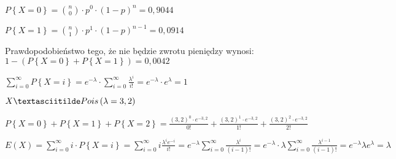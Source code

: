 \documentclass[fleqn]{article}
\begin{document}
$P\left\lbrace X=0\right\rbrace={n\choose 0}\cdot p^0\cdot\left(1-p\right)^n=0,9044$

$P\left\lbrace X=1\right\rbrace={n\choose 1}\cdot p^1\cdot\left(1-p\right)^{n-1}=0,0914$

Prawdopodobieństwo tego, że nie będzie zwrotu pieniędzy wynosi: $1-\left(P\left\lbrace X=0\right\rbrace + P\left\lbrace X=1\right\rbrace \right)=0,0042$

\medskip
{}
\medskip

$\sum_{i=0}^{\infty}P\left\lbrace X=i\right\rbrace=e^{-\lambda}\cdot\sum_{i=0}^{\infty}\frac{\lambda^i}{i!}=e^{-\lambda}\cdot e^\lambda=1$

\medskip
{}
\medskip

$ X\textasciitilde Pois\left(\lambda =3,2\right)$

$ P\left\lbrace X=0\right\rbrace+P\left\lbrace X=1\right\rbrace + P\left\lbrace X=2\right\rbrace=\frac{\left(3,2\right)^0\cdot e^{-3,2}}{0!}+\frac{\left(3,2\right)^1\cdot e^{-3,2}}{1!}+\frac{\left(3,2\right)^2\cdot e^{-3,2}}{2!}$

\medskip
{}
\medskip

$E(X)=\sum_{i=0}^\infty i\cdot P\left\lbrace X=i\right\rbrace=\sum_{i=0}^\infty i\frac{\lambda^ie^{-i}}{i!}=e^{-\lambda}\sum_{i=0}^\infty\frac{\lambda^i}{(i-1)!}=e^{-\lambda}\cdot\lambda\sum_{i=0}^\infty\frac{\lambda^{i-1}}{(i-1)!}=e^{-\lambda}\lambda e^\lambda=\lambda$
\end{document}

